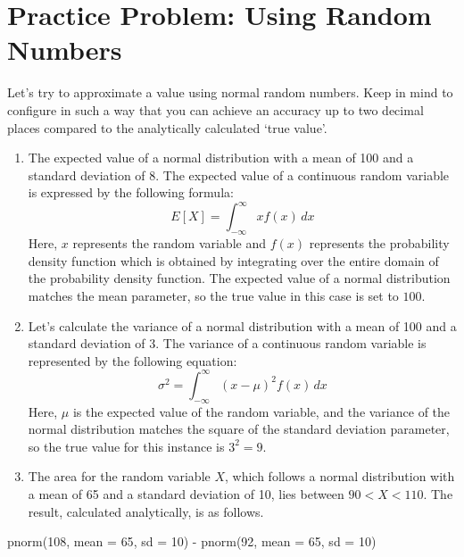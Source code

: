\documentclass[
  a4paper,
]{book}
\newenvironment{Shaded}{\begin{snugshade}}{\end{snugshade}}
\newcommand{\AttributeTok}[1]{\textcolor[rgb]{0.40,0.45,0.13}{#1}}
\newcommand{\DecValTok}[1]{\textcolor[rgb]{0.68,0.00,0.00}{#1}}
\newcommand{\FunctionTok}[1]{\textcolor[rgb]{0.28,0.35,0.67}{#1}}
\newcommand{\NormalTok}[1]{\textcolor[rgb]{0.00,0.23,0.31}{#1}}
\newcommand{\SpecialCharTok}[1]{\textcolor[rgb]{0.37,0.37,0.37}{#1}}
\providecommand{\tightlist}{%
  \setlength{\itemsep}{0pt}\setlength{\parskip}{0pt}}\usepackage{longtable,booktabs,array}
\begin{document}
\section{Practice Problem: Using Random
Numbers}\label{practice-problem-using-random-numbers}

Let's try to approximate a value using normal random numbers. Keep in
mind to configure in such a way that you can achieve an accuracy up to
two decimal places compared to the analytically calculated `true value'.

\begin{enumerate}
\def\labelenumi{\arabic{enumi}.}
\tightlist
\item
  The expected value of a normal distribution with a mean of 100 and a
  standard deviation of 8. The expected value of a continuous random
  variable is expressed by the following formula:
  \[E[X] = \int_{-\infty}^{\infty} x f(x) \, dx\] Here, \(x\) represents
  the random variable and \(f(x)\) represents the probability density
  function which is obtained by integrating over the entire domain of
  the probability density function. The expected value of a normal
  distribution matches the mean parameter, so the true value in this
  case is set to \(100\).
\item
  Let's calculate the variance of a normal distribution with a mean of
  100 and a standard deviation of 3. The variance of a continuous random
  variable is represented by the following equation:
  \[\sigma^2 = \int_{-\infty}^{\infty} (x - \mu)^2 f(x) \, dx\] Here,
  \(\mu\) is the expected value of the random variable, and the variance
  of the normal distribution matches the square of the standard
  deviation parameter, so the true value for this instance is
  \(3^2 = 9\).
\item
  The area for the random variable \(X\), which follows a normal
  distribution with a mean of 65 and a standard deviation of 10, lies
  between \(90 < X < 110\). The result, calculated analytically, is as
  follows.
\end{enumerate}

\begin{Shaded}
\begin{Highlighting}[]
\FunctionTok{pnorm}\NormalTok{(}\DecValTok{108}\NormalTok{, }\AttributeTok{mean =} \DecValTok{65}\NormalTok{, }\AttributeTok{sd =} \DecValTok{10}\NormalTok{) }\SpecialCharTok{{-}} \FunctionTok{pnorm}\NormalTok{(}\DecValTok{92}\NormalTok{, }\AttributeTok{mean =} \DecValTok{65}\NormalTok{, }\AttributeTok{sd =} \DecValTok{10}\NormalTok{)}
\end{Highlighting}
\end{Shaded}
\end{document}
